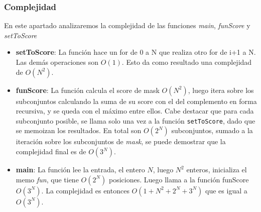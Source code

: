 \subsubsection{Complejidad}

En este apartado analizaremos la complejidad de las funciones \textit{main}, \textit{funScore} y \textit{setToScore}

\begin{itemize}
	\item \textbf{setToScore}: La funci\'on hace un for de 0 a N que realiza otro for de i+1 a N. Las dem\'as operaciones son $O(1)$. Esto da como resultado una complejidad de $O(N^2)$.

	\item \textbf{funScore}: La funci\'on calcula el score de mask $O(N^2)$, luego itera sobre los subconjuntos calculando la suma de su score con el del complemento en forma recursiva, y se queda con el m\'aximo entre ellos.
	Cabe destacar que para cada subconjunto posible, se llama solo una vez a la funci\'on \texttt{setToScore}, dado que se memoizan los resultados. En total son $O(2^N)$ subconjuntos, sumado a la iteraci\'on sobre los subconjuntos de \textit{mask}, se puede demostrar que la complejidad final es de $O(3^N)$.

	\item \textbf{main}: La funci\'on lee la entrada, el entero $N$, luego $N^2$ enteros, inicializa el memo \textit{fun}, que tiene $O(2^N)$ posiciones. Luego llama a la funci\'on funScore $O(3^N)$. La complejidad es entonces $O(1 + N^2 + 2^N + 3^N)$ que es igual a $O(3^N)$.
\end{itemize}

